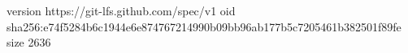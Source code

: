 version https://git-lfs.github.com/spec/v1
oid sha256:e74f5284b6c1944e6e874767214990b09bb96ab177b5c7205461b382501f89fe
size 2636
